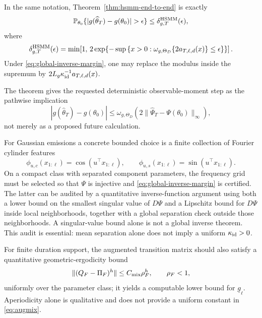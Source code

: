 \documentclass[11pt]{article}
\theoremstyle{definition}
\theoremstyle{remark}
\newcommand{\Pp}{\mathbb P}
\begin{document}
In the same notation, Theorem~\ref{thm:hsmm-end-to-end} is exactly
\begin{equation}
 \Pp_{\theta_0}\{|g(\widehat\theta_T)-g(\theta_0)|>\epsilon\}
 \le\delta_{g,T}^{\rm HSMM}(\epsilon),
 \label{eq:hsmm-epsilon-delta}
\end{equation}
where
\[
 \delta_{g,T}^{\rm HSMM}(\epsilon)=
 \min\!\left[
 1,\,
 2\exp\!\left\{
 -\sup\left\{x>0:
 \omega_{g,\Theta_D}\{2a_{T,\ell,d}(x)\}\le\epsilon
 \right\}\right\}\right].
\]
Under \eqref{eq:global-inverse-margin}, one may replace the modulus inside
the supremum by
$2L_g\kappa_{\rm id}^{-1}a_{T,\ell,d}(x)$.

The theorem gives the requested deterministic observable-moment step as the
pathwise implication
\begin{equation}
 |g(\widehat\theta_T)-g(\theta_0)|
 \le
 \omega_{g,\Theta_D}\!\left(
 2\|\widehat\Psi_T-\Psi(\theta_0)\|_\infty\right),
 \label{eq:observable-deterministic}
\end{equation}
not merely as a proposed future calculation.

For Gaussian emissions a concrete bounded choice is a finite collection of
Fourier cylinder features
\[
 \phi_{u,c}(x_{1:\ell})=\cos(u^\top x_{1:\ell}),\qquad
 \phi_{u,s}(x_{1:\ell})=\sin(u^\top x_{1:\ell}).
\]
On a compact class with separated component parameters, the frequency grid
must be selected so that $\Psi$ is injective and
\eqref{eq:global-inverse-margin} is certified.  The latter can be audited by
a quantitative inverse-function argument using both a lower bound on the
smallest singular value of $D\Psi$ and a Lipschitz bound for $D\Psi$ inside
local neighborhoods, together with a global separation check outside those
neighborhoods.  A singular-value bound alone is not a global inverse theorem.
This audit is essential: mean separation alone does not imply a uniform
$\kappa_{\rm id}>0$.

For finite duration support, the augmented transition matrix should also
satisfy a quantitative geometric-ergodicity bound
\begin{equation}
 \|(Q_F-\Pi_F)^h\|\le C_{\rm mix}\rho_F^h,
 \qquad \rho_F<1,
 \label{eq:augmix}
\end{equation}
uniformly over the parameter class; it yields a computable lower bound for
$\underline g_\ell$.  Aperiodicity alone is qualitative and does not provide
a uniform constant in \eqref{eq:augmix}.


\end{document}
